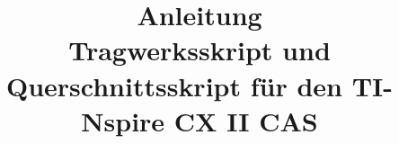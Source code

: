 \documentclass[11pt,a4paper]{article}

\usepackage[utf8]{inputenc}
\usepackage[T1]{fontenc}
\usepackage[ngerman]{babel}
\usepackage[a4paper,margin=2.4cm]{geometry}
\usepackage{amsmath}
\usepackage{amssymb}
\usepackage{array}
\usepackage{booktabs}
\usepackage{longtable}
\usepackage{graphicx}
\usepackage{xcolor}
\usepackage[autostyle,german=quotes]{csquotes}
\usepackage[hidelinks]{hyperref}

\setlength{\parindent}{0pt}
\setlength{\parskip}{0.6em}

\newcommand{\taste}[1]{\textsf{\textbf{#1}}}
\newcommand{\code}[1]{\texttt{#1}}
\newcommand{\bildplatz}[2]{%
  \begin{figure}[htbp]
    \centering
    \fbox{\parbox[c][3.0cm][c]{0.78\linewidth}{\centering\itshape Platz für ein Bild: \texttt{#1}}}
    \caption{#2}
  \end{figure}}

\title{Anleitung\\[0.3em]\large Tragwerksskript und Querschnittsskript für den TI-Nspire CX II CAS}
\author{}
\date{}


\maketitle
\tableofcontents
\newpage

\section{Grundlegendes}

\subsection{Überblick}

Das Programm besteht aus drei Modulen, und deckt große teile der TM1 und TM2 Klausur ab sowie auch Teile der Statik Klausur. Dafür gibt es drei Module, also Seiten auf dem Taschenrechner. Diese sind:\\

